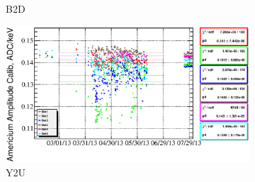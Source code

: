 \documentclass[a4paper,12pt]{article}
\begin{document}
\begin{figure}
\begin{subfigure}[t]{0.49\textwidth}
\caption{B2D}
\end{subfigure}
%
\hfill
%
\begin{subfigure}[t]{0.49\textwidth}
\includegraphics[width=\textwidth]{gfx/run13_alpha_study/Y2U/c_chAmGain_by_day_Y2U.eps}
\caption{Y2U}
\end{subfigure}
%
\caption{\amgainlabel{}}
\label{fig:gainAm}
\end{figure}
\end{document}
